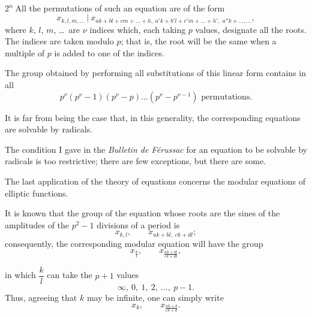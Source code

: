 

2\textsuperscript{o} All the permutations of such an equation are of
the form
\[
x_{k,l,m,\ldots}\ \big|\
x_{ak+bl+cm+\ldots+h,\;a'k+b'l+c'm+\ldots+h',\;a''k+\ldots,\ldots},
\]
where $k$, $l$, $m$, \ldots\ are $\nu$ indices which, each taking $p$
values, designate all the roots. The indices are taken modulo $p$; that
is, the root will be the same when a multiple of $p$ is added to one of
the indices.

The group obtained by performing all substitutions of this linear form
contains in all
\[
p^{\nu}(p^{\nu}-1)(p^{\nu}-p)\ldots(p^{\nu}-p^{\nu-1})\text{ permutations.}
\]

It is far from being the case that, in this generality, the corresponding
equations are solvable by radicals.

The condition I gave in the \emph{Bulletin de Férussac} for an equation
to be solvable by radicals is too restrictive; there are few exceptions,
but there are some.

The last application of the theory of equations concerns the modular
equations of elliptic functions.

It is known that the group of the equation whose roots are the sines of
the amplitudes of the $p^2-1$ divisions of a period is
\[
x_{k,l},\qquad x_{ak+bl,\;ck+dl};
\]
consequently, the corresponding modular equation will have the group
\[
x_{\frac{k}{l}},\qquad x_{\frac{ak+bl}{ck+dl}},
\]


in which $\dfrac{k}{l}$ can take the $p+1$ values
\[
\infty,\ 0,\ 1,\ 2,\ \ldots,\ p-1.
\]
Thus, agreeing that $k$ may be infinite, one can simply write
\[
x_k,\qquad x_{\frac{ak+b}{ck+d}}.
\]

